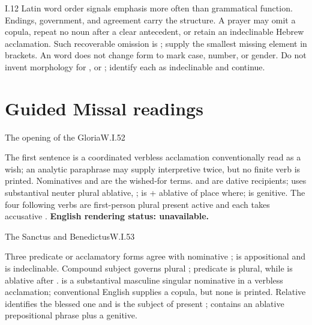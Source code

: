 \begin{courseunit}{I.12}
Latin word order signals emphasis more often than grammatical function.
Endings, government, and agreement carry the structure. A prayer may omit a
copula, repeat no noun after a clear antecedent, or retain an indeclinable
Hebrew acclamation. Such recoverable omission is ; supply the
smallest missing element in brackets. An  word does not
change form to mark case, number, or gender. Do not invent morphology for , or ; identify each as indeclinable and continue.

\section{Guided Missal readings}

\begin{workedexample}{The opening of the Gloria}{W.I.52}

The first sentence is a coordinated verbless acclamation conventionally read
as a wish; an analytic paraphrase may supply interpretive \Latin{[sit]} twice,
but no finite verb is printed. Nominatives  and  are
the wished-for terms.  and
 are dative recipients;  uses
substantival neuter plural ablative, ;
 is  + ablative of place where;
 is genitive.
The four following verbs are first-person plural present active and each
takes accusative .
\textbf{English rendering status: unavailable.}
\end{workedexample}

\begin{workedexample}{The Sanctus and Benedictus}{W.I.53}

Three predicate or acclamatory  forms agree with nominative
;  is appositional and  is
indeclinable. Compound subject  governs plural
; predicate  is plural, while  is
ablative after .  is a substantival masculine
singular nominative in a verbless acclamation; conventional English supplies a
copula, but none is printed. Relative  identifies the blessed one
and is the subject of present ;  contains an ablative
prepositional phrase plus a genitive.


\end{workedexample}
\end{courseunit}
